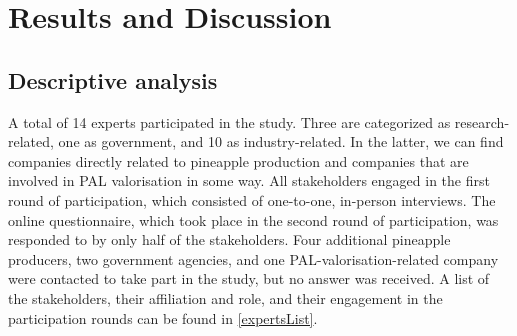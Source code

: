 \section{Results and Discussion}

        
\subsection{Descriptive analysis}
\label{descriptiveFCM}

A total of 14 experts participated in the study. Three are categorized as research-related, one as government, and 10 as industry-related. In the latter, we can find companies directly related to pineapple production and companies that are involved in PAL valorisation in some way. All stakeholders engaged in the first round of participation, which consisted of one-to-one, in-person interviews. The online questionnaire, which took place in the second round of participation, was responded to by only half of the stakeholders. Four additional pineapple producers, two government agencies, and one PAL-valorisation-related company were contacted to take part in the study, but no answer was received. A list of the stakeholders, their affiliation and role, and their engagement in the participation rounds can be found in \cref{expertsList}.


